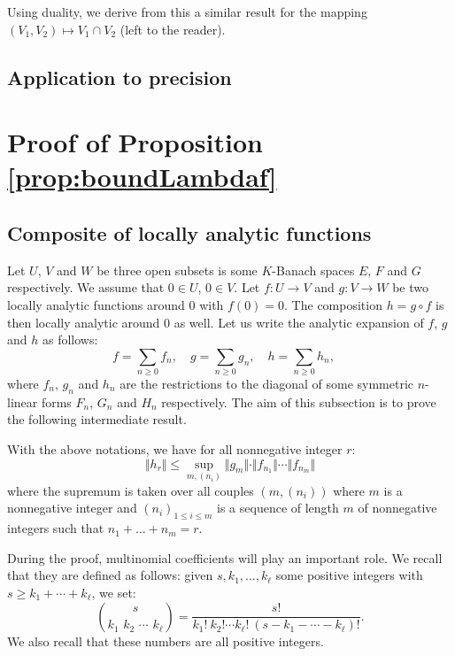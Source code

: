 \documentclass{sig-alternate}
\begin{document}
Using duality, we derive from this a similar result for the mapping 
$(V_1, V_2) \mapsto V_1 \cap V_2$ (left to the reader).

\subsection{Application to precision}


\appendix

\section{Proof of Proposition \ref{prop:boundLambdaf}}
\label{app:proof}

\subsection{Composite of locally analytic functions}

Let $U$, $V$ and $W$ be three open subsets is some $K$-Banach spaces 
$E$, $F$ and $G$ respectively. We assume that $0 \in U$, $0 \in V$. Let 
$f : U \to V$ and $g : V \to W$ be two locally analytic functions around 
$0$ with $f(0) = 0$. The composition $h = g \circ f$ is then locally 
analytic around $0$ as well. Let us write the analytic expansion of $f$, 
$g$ and $h$ as follows:
$$f = \sum_{n \geq 0} f_n, \quad 
g = \sum_{n \geq 0} g_n, \quad
h = \sum_{n \geq 0} h_n, \quad$$
where $f_n$, $g_n$ and $h_n$ are the restrictions to the diagonal of 
some symmetric $n$-linear forms $F_n$, $G_n$ and $H_n$ respectively. The 
aim of this subsection is to prove the following intermediate result.

\begin{prop}
\label{prop:boundhr}
With the above notations, we have for all nonnegative integer $r$:
$$\Vert h_r \Vert \leq \sup_{m, (n_i)}
  \Vert g_m \Vert \cdot \Vert f_{n_1} \Vert \cdots \Vert f_{n_m} \Vert$$
where the supremum is taken over all couples $(m, (n_i))$ where $m$
is a nonnegative integer and $(n_i)_{1 \leq i \leq m}$ is a sequence of
length $m$ of nonnegative integers such that $n_1 + \ldots + n_m = r$.
\end{prop}

During the proof, multinomial coefficients will play an important role. 
We recall that they are defined as follows: 
given $s, k_1, \ldots, k_\ell$ some positive integers with $s \geq
k_1 + \cdots + k_\ell$, we set:
$$\binom s {k_1 \,\, k_2 \,\, \cdots \,\, k_\ell} =
  \frac{s!}{k_1!\: k_2! \cdots k_\ell! \: (s{-}k_1{-}\cdots{-}k_\ell)!}.$$
We also recall that these numbers are all positive integers.
\end{document}
